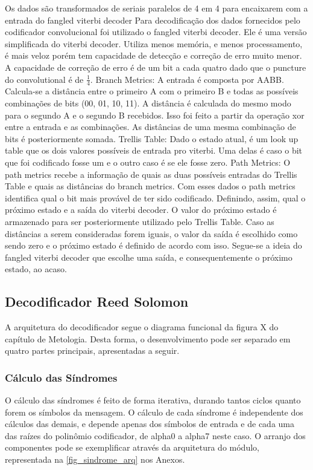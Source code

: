 	Os dados são transformados de seriais paralelos de 4 em 4 para encaixarem com a entrada do fangled viterbi decoder
	Para decodificação dos dados fornecidos pelo codificador convolucional foi utilizado o fangled  viterbi decoder. Ele é uma versão simplificada do viterbi decoder. Utiliza menos memória, e menos processamento, é mais veloz porém tem capacidade de detecção e correção de erro muito menor. A capacidade de correção de erro é de um bit a cada quatro dado que o puncture do convolutional é de $\frac{1}{4}$.
	Branch Metrics: A entrada é composta por AABB. Calcula-se a distância entre o primeiro A com o primeiro B e todas as possíveis combinações de bits (00, 01, 10, 11). A distância é calculada do mesmo modo para o segundo A e o segundo B recebidos. Isso foi feito a partir da operação xor entre a entrada e as combinações. As distâncias de uma mesma combinação de bits é posteriormente somada.
	Trellis Table: Dado o estado atual, é um look up table que os dois valores possíveis de entrada pro viterbi. Uma delas é caso o bit que foi codificado fosse um e o outro caso é se ele fosse zero.
	Path Metrics: O path metrics recebe a informação de quais as duas possíveis entradas do Trellis Table e quais as distâncias do branch metrics. Com esses dados o path metrics identifica qual o bit mais provável de ter sido codificado. Definindo, assim, qual o próximo estado e a saída do viterbi decoder. 
	O valor do próximo estado é armazenado para ser posteriormente utilizado pelo Trellis Table.
	Caso as distâncias a serem consideradas forem iguais, o valor da saída é escolhido como sendo zero e o próximo estado é definido de acordo com isso. Segue-se a ideia do fangled viterbi decoder que escolhe uma saída, e consequentemente o próximo estado, ao acaso. 
	
	
	\subsection{Decodificador Reed Solomon}
	
	A arquitetura do decodificador segue o diagrama funcional da figura X do capítulo de Metologia. Desta forma, o desenvolvimento pode ser separado em quatro partes principais, apresentadas a seguir.
	
	\subsubsection{Cálculo das Síndromes}
	
	O cálculo das síndromes é feito de forma iterativa, durando tantos ciclos quanto forem os símbolos da mensagem. O cálculo de cada síndrome é independente dos cálculos das demais, e depende apenas dos símbolos de entrada e de cada uma das raízes do polinômio codificador, de alpha0 a alpha7 neste caso. O arranjo dos componentes pode se exemplificar através da arquitetura do módulo, representada na \autoref{fig_sindrome_arq} nos Anexos.

